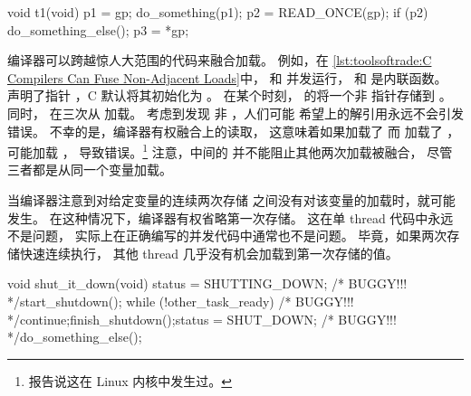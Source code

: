 \begin{description}[labelsep=.4em]
\begin{listing}
\begin{fcvlabel}
\begin{VerbatimLL}[commandchars=\\\[\]]
void t1(void)
{
	p1 = gp; \lnlbl[p1]
	do_something(p1);
	p2 = READ_ONCE(gp); \lnlbl[p2]
	if (p2) { \lnlbl[if]
		do_something_else();
		p3 = *gp; \lnlbl[p3]
	}
}
\end{VerbatimLL}
\end{fcvlabel}
\caption{C 编译器可以融合非相邻加载}
\label{lst:toolsoftrade:C Compilers Can Fuse Non-Adjacent Loads}
\end{listing}

\begin{fcvref}
编译器可以跨越惊人大范围的代码来融合加载。
例如，在
\cref{lst:toolsoftrade:C Compilers Can Fuse Non-Adjacent Loads}中，
 和  并发运行， 和
 是内联函数。
声明了指针 ，C 默认将其初始化为 。
在某个时刻， 的将一个非 
指针存储到 。
同时， 在三次从  加载。
考虑到发现  非 ，人们可能
希望上的解引用永远不会引发错误。
不幸的是，编译器有权融合上的读取，
这意味着如果加载了  而
加载了 ，可能加载 ，
导致错误。\footnote{
	报告说这在 Linux 内核中发生过。}
注意，中间的  并不能阻止其他两次加载被融合，
尽管三者都是从同一个变量加载。
\end{fcvref}

\QuickQuizEnd

\item[存储融合（Store fusing）] 当编译器注意到对给定变量的连续两次存储
之间没有对该变量的加载时，就可能发生。
在这种情况下，编译器有权省略第一次存储。
这在单 thread 代码中永远不是问题，
实际上在正确编写的并发代码中通常也不是问题。
毕竟，如果两次存储快速连续执行，
其他 thread 几乎没有机会加载到第一次存储的值。

\begin{listing}
\begin{fcvlabel}
\begin{VerbatimLL}[commandchars=\\\[\]]
void shut_it_down(void)
{
	status = SHUTTING_DOWN; /* BUGGY!!! */\lnlbl[store:a]
	start_shutdown();
	while (!other_task_ready) /* BUGGY!!! */\lnlbl[loop:b]
		continue;\lnlbl[loop:e]
	finish_shutdown();\lnlbl[finish]
	status = SHUT_DOWN; /* BUGGY!!! */\lnlbl[store:b]
	do_something_else();
}


\end{VerbatimLL}
\end{fcvlabel}
\end{listing}
\end{description}
